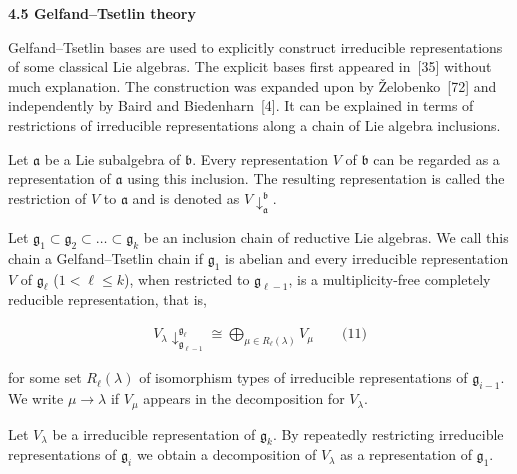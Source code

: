 \par\medskip\noindent\textbf{4.5 Gelfand–Tsetlin theory}\par




Gelfand–Tsetlin bases are used to explicitly construct irreducible representations of some classical Lie algebras.
The explicit bases first appeared in [35] without much explanation.
The construction was expanded upon by Želobenko [72] and independently by Baird and Biedenharn [4].
It can be explained in terms of restrictions of irreducible representations along a chain of Lie algebra inclusions.





Let $\mathfrak{a}$ be a Lie subalgebra of $\mathfrak{b}$.
Every representation $V$ of $\mathfrak{b}$ can be regarded as a representation of $\mathfrak{a}$ using this inclusion.
The resulting representation is called the restriction of $V$ to $\mathfrak{a}$ and is denoted as $V{\downarrow}^{\mathfrak{b}}_{\mathfrak{a}}$.





Let $\mathfrak{g}_{1}\subset\mathfrak{g}_{2}\subset\dots\subset\mathfrak{g}_{k}$ be an inclusion chain of reductive Lie algebras.
We call this chain a Gelfand–Tsetlin chain if $\mathfrak{g}_{1}$ is abelian and every irreducible representation $V$ of $\mathfrak{g}_{\ell}$ ($1<\ell\leq k$), when restricted to $\mathfrak{g}_{\ell-1}$, is a multiplicity-free completely reducible representation, that is,



\[\begin{aligned}
\displaystyle V_{\lambda}{\downarrow}^{\mathfrak{g}_{\ell}}_{\mathfrak{g}_{\ell-1}}\cong\bigoplus_{\mu\in R_{\ell}(\lambda)}V_{\mu}\qquad\text{(11)}
\end{aligned}\]


for some set $R_{\ell}(\lambda)$ of isomorphism types of irreducible representations of $\mathfrak{g}_{i-1}$.
We write $\mu\to\lambda$ if $V_{\mu}$ appears in the decomposition for $V_{\lambda}$.





Let $V_{\lambda}$ be a irreducible representation of $\mathfrak{g}_{k}$.
By repeatedly restricting irreducible representations of $\mathfrak{g}_{i}$ we obtain a decomposition of $V_{\lambda}$ as a representation of $\mathfrak{g}_{1}$.



